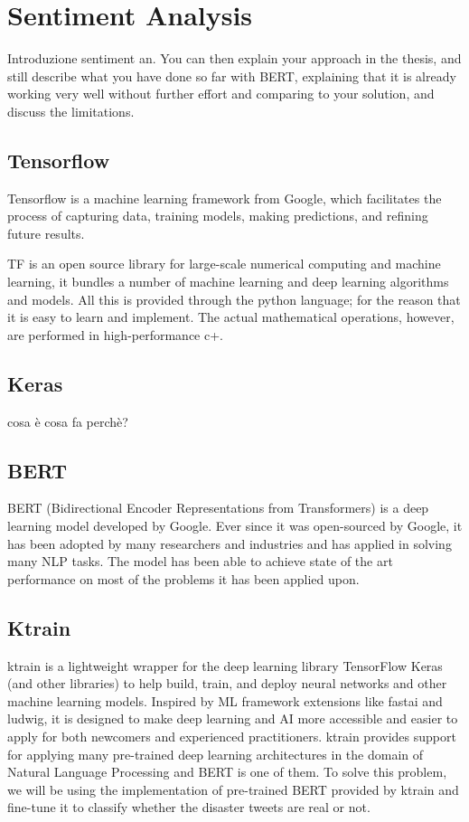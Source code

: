 \section{Sentiment Analysis}
Introduzione sentiment an.
You can then explain your approach in the thesis, and still describe what you have done so far with BERT, explaining that it is already working very well without further effort and comparing to your solution, and discuss the limitations. 
\subsection{Tensorflow}
Tensorflow is a machine learning framework from Google, which facilitates the process of capturing data, training models, making predictions, and refining future results.

TF is an open source library for large-scale numerical computing and machine learning, it bundles a number of machine learning and deep learning algorithms and models.
All this is provided through the python language; for the reason that it is easy to learn and implement.
The actual mathematical operations, however, are performed in high-performance c+.

\subsection{Keras}
cosa è
cosa fa
perchè?
\subsection{BERT}
BERT (Bidirectional Encoder Representations from Transformers) is a deep learning model developed by Google. Ever since it was open-sourced by Google, it has been adopted by many researchers and industries and has applied in solving many NLP tasks. The model has been able to achieve state of the art performance on most of the problems it has been applied upon.
\subsection{Ktrain}
ktrain is a lightweight wrapper for the deep learning library TensorFlow Keras (and other libraries) to help build, train, and deploy neural networks and other machine learning models. Inspired by ML framework extensions like fastai and ludwig, it is designed to make deep learning and AI more accessible and easier to apply for both newcomers and experienced practitioners.
ktrain provides support for applying many pre-trained deep learning architectures in the domain of Natural Language Processing and BERT is one of them. To solve this problem, we will be using the implementation of pre-trained BERT provided by ktrain and fine-tune it to classify whether the disaster tweets are real or not.

